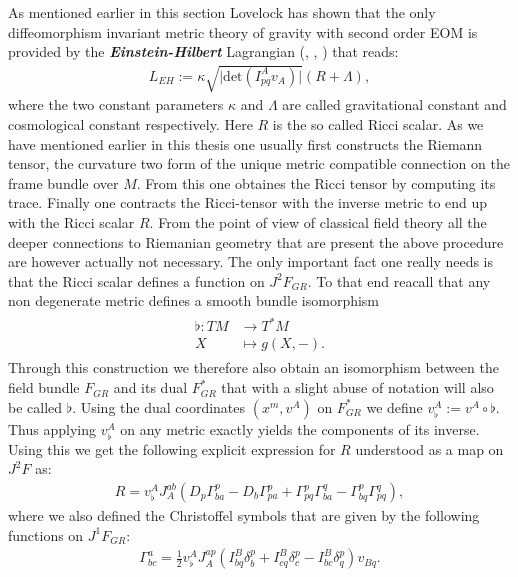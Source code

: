 \documentclass[a4paper,12pt, DIV=14, BCOR=5mm, twoside, headsepline, numbers=noenddot]{scrbook}
\begin{document}
As mentioned earlier in this section Lovelock has shown that the only diffeomorphism invariant metric theory of gravity with second order EOM is provided by the \textit{\textbf{Einstein-Hilbert}} Lagrangian (\cite{Lovelock1969}, \cite{doi:10.1063/1.1665613}, \cite{doi:10.1063/1.1666069}) that reads:
\begin{align}
    L_{EH} := \kappa \sqrt{\vert \mathrm{det} \left ( I^A_{pq}v_A \right ) \vert }  \left( R + \Lambda \right ),
\end{align}
where the two constant parameters $\kappa$ and $\Lambda$ are called gravitational constant and cosmological constant respectively. Here $R$ is the so called Ricci scalar. As we have mentioned earlier in this thesis one usually first constructs the Riemann tensor, the curvature two form of the unique metric compatible connection on the frame bundle over $M$. From this one obtaines the Ricci tensor by computing its trace. Finally one contracts the Ricci-tensor with the inverse metric to end up with the Ricci scalar $R$. From the point of view of classical field theory all the deeper connections to Riemanian geometry that are present the above procedure are however actually not necessary. The only important fact one really needs is that the Ricci scalar defines a function on $J^2F_{GR}$. To that end reacall that any non degenerate metric defines a smooth bundle isomorphism 
\begin{align}\label{music}
\begin{aligned}
\flat : TM &\longrightarrow T^{\ast}M\\
X &\longmapsto g(X,-) .
\end{aligned}
\end{align}
Through this construction we therefore also obtain an isomorphism between the field bundle $F_{GR}$ and its dual $F_{GR}^{\ast}$ that with a slight abuse of notation will also be called $\flat$. 
Using the dual coordinates $(x^m,v^A)$ on $F_{GR}^{\ast}$ we define $v^A_{\flat} := v^A \circ \flat$. Thus applying $v^A_{\flat}$ on any metric exactly yields the components of its inverse. Using this we get the following explicit expression for $R$ understood as a map on $J^2F$ as:
\begin{align}
R = v_{\flat}^A J_A^{ab} \left ( D_p \Gamma^p_{ba} - D_b \Gamma^p_{pa} + \Gamma^p_{pq} \Gamma^q_{ba} - \Gamma^p_{bq} \Gamma^q_{pq} \right ),
\end{align}
where we also defined the Christoffel symbols that are given by the following functions on $J^1F_{GR}$:
\begin{align}
\Gamma^a_{bc} = \frac{1}{2} v_{\flat}^A J_A^{ap} \left ( I^B_{bq}\delta^p_b + I^B_{cq}\delta^p_c - I^B_{bc}\delta^p_q  \right ) v_{Bq}.
\end{align}
\end{document}
